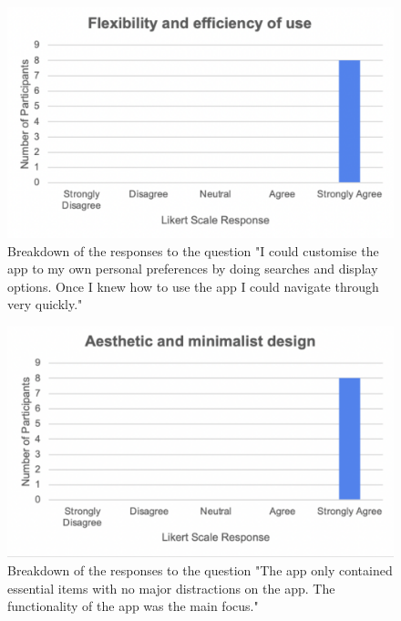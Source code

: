 \documentclass{l4proj}
\begin{document}
\begin{appendices}
\begin{figure}[H]
    \begin{centering}
    \includegraphics[scale=0.5]{images/heuristic7.pdf}
    \caption{Breakdown of the responses to the question "I could customise the app to my own personal preferences by doing searches and display options. Once I knew how to use the app I could navigate through very quickly."}
    \label{fig: heuristic7}
    \end{centering}
\end{figure}

\begin{figure}[H]
    \begin{centering}
    \includegraphics[scale=0.5]{images/heuristic8.pdf}
    \caption{Breakdown of the responses to the question "The app only contained essential items with no major distractions on the app. The functionality of the app was the main focus."}
    \label{fig: heuristic8}
    \end{centering}
\end{figure}


\end{appendices}
\end{document}
